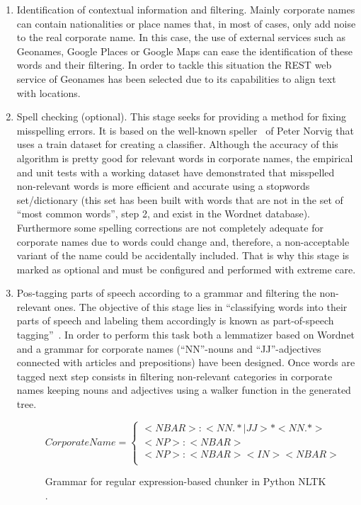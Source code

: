 \documentclass{llncs}
\begin{document}
\begin{enumerate}
\item Identification of contextual information and filtering. Mainly corporate names can contain nationalities or place names that, in most of 
cases, only add noise to the real corporate name. In this case, the use of external services such as Geonames, Google Places 
or Google Maps can ease the identification of these words and their filtering. In order to tackle this situation the REST web service 
of Geonames has been selected due to its capabilities to align text with locations.

\item Spell checking (optional). This stage seeks for providing a method for fixing misspelling errors. It is based on the 
well-known speller~\cite{NorvigSpelling} of Peter Norvig that uses a train dataset for creating a classifier. Although the accuracy of this 
algorithm is pretty good for relevant words in corporate names, the empirical and unit tests with a working dataset 
have demonstrated that misspelled non-relevant words is more efficient and accurate using a stopwords set/dictionary (this set has been 
built with words that are not in the set of ``most common words'', step 2, and exist in the Wordnet database). Furthermore some spelling corrections 
are not completely adequate for corporate names due to words could change and, therefore, a non-acceptable variant of the name 
could be accidentally included. That is why this stage is marked as optional and must be configured and performed with extreme care.

\item Pos-tagging parts of speech according to a grammar and filtering the non-relevant ones. The objective 
of this stage lies in ``classifying words into their parts of speech and labeling them accordingly is known as part-of-speech tagging''~\cite{LoperBird02}. In order 
to perform this task both a lemmatizer based on Wordnet and a grammar for corporate names (``NN''-nouns and ``JJ''-adjectives connected with articles and 
prepositions) have been designed. Once words are tagged next step consists in filtering non-relevant categories 
in corporate names keeping nouns and adjectives using a walker function in the generated tree.
\begin{figure}[ht]
\begin{center}
\[
Corporate Name=
\begin{cases}
<NBAR>:<NN.*|JJ>* <NN.*> \\
<NP>  :{<NBAR>} \\
<NP>  :{<NBAR><IN><NBAR>} \\
\end{cases}
\]
\end{center}
\caption{Grammar for regular expression-based chunker in Python NLTK .}
\label{figure:step-4}
\end{figure}



\end{enumerate}
\end{document}
